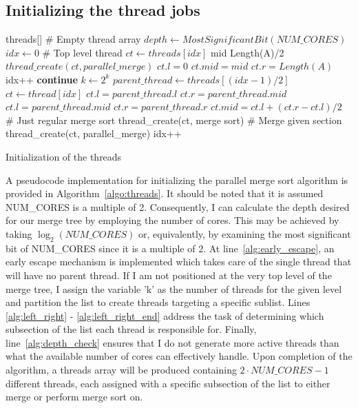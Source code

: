 \subsection{Initializing the thread jobs}\label{sec:init_threads}
\begin{algorithm}
  \begin{algorithmic}[1]
    \Require threads[] \# Empty thread array
    \State $depth \leftarrow MostSignificantBit(NUM\_CORES)$
    \State $idx \leftarrow 0$
     \label{alg:early_escape}
    \State \# Top level thread
    \State $ct \leftarrow threads[idx]$
    \State mid \leftarrow Length(A)/2
    \State $thread\_create(ct, parallel\_merge)$
    \State $ct.l = 0$
    \State $ct.mid = mid$
    \State $ct.r = Length(A)$
    \State idx++
    \State \textbf{continue}
    \EndIf
    \State $k \leftarrow 2^k$
    \State $parent\_thread \leftarrow threads[(idx - 1)/2]$
    \State $ct \leftarrow thread[idx]$
     \label{alg:left_right}
    \State $ct.l = parent\_thread.l$
    \State $ct.r = parent\_thread.mid$
    \Else
    \State $ct.l = parent\_thread.mid$
    \State $ct.r = parent\_thread.r$
    \EndIf
    \State $ct.mid = ct.l + (ct.r - ct.l)/2$ \label{alg:left_right_end}
     \label{alg:depth_check}
    \State \# Just regular merge sort
    \State thread\_create(ct, merge sort)
    \Else
    \State \# Merge given section
    \State thread\_create(ct, parallel\_merge)
    \EndIf
    \State idx++
    \EndFor
    \EndFor
  \EndProcedure
  \end{algorithmic}
  \caption{Initialization of the threads}\label{algo:threads}
\end{algorithm}
A pseudocode implementation for initializing the parallel merge sort algorithm
is provided in Algorithm~\ref{algo:threads}. It should be noted that it is
assumed NUM\_CORES is a multiple of 2. Consequently, I can calculate the depth
desired for our merge tree by employing the number of cores. This may be
achieved by taking $\log_2(NUM\_CORES)$ or, equivalently, by examining the most
significant bit of NUM\_CORES since it is a multiple of 2. At
line~\ref{alg:early_escape}, an early escape mechanism is implemented which
takes care of the single thread that will have no parent thread. If I am not
positioned at the very top level of the merge tree, I assign the variable 'k'
as the number of threads for the given level and partition the list to create
threads targeting a specific sublist. Lines \ref{alg:left_right} -
\ref{alg:left_right_end} address the task of determining which subsection of the
list each thread is responsible for. Finally, line~\ref{alg:depth_check} ensures
that I do not generate more active threads than what the available number of
cores can effectively handle. Upon completion of the algorithm, a threads array
will be produced containing $2 \cdot NUM\_CORES - 1$ different threads, each
assigned with a specific subsection of the list to either merge or perform
merge sort on.

